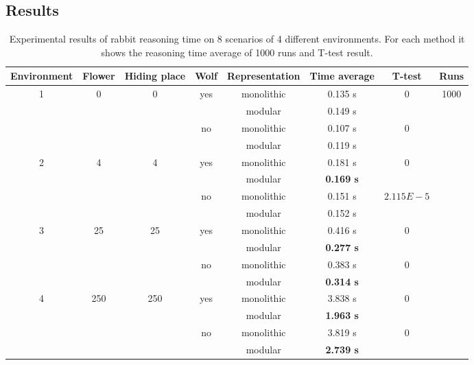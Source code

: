\documentclass{aamas2012}
\begin{document}
\subsection{Results}


	\begin{table}
		\label{experiment_results}
		\centering
		\begin{tabular}{ | c | c | c | c | c | c | c | c | }
		\hline
		Environment & Flower & Hiding place & Wolf & Representation & Time average & T-test & Runs\\	
		\hline
	 	\multirow{4}{*}{1} & \multirow{4}{*}{0} & \multirow{4}{*}{0} & \multirow{2}{*}{yes} & monolithic & 0.135 s & \multirow{2}{*}{0} & \multirow{16}{*}{1000} \\
		& & & & modular & 0.149 s & & \\ \cline{4-7}
		& & & \multirow{2}{*}{no} & monolithic & 0.107 s & \multirow{2}{*}{0} & \\
		& & & & modular & 0.119 s & & \\ \cline{1-7}
		\multirow{4}{*}{2} & \multirow{4}{*}{4} & \multirow{4}{*}{4} & \multirow{2}{*}{yes} & monolithic & 0.181 s & \multirow{2}{*}{0} & \\
		& & & & modular & \textbf{0.169 s} & & \\ \cline{4-7}
		& & & \multirow{2}{*}{no} & monolithic & 0.151 s & \multirow{2}{*}{$2.115E-5$} & \\
		& & & & modular & 0.152 s & & \\ \cline{1-7}
		\multirow{4}{*}{3} & \multirow{4}{*}{25} & \multirow{4}{*}{25} & \multirow{2}{*}{yes} & monolithic & 0.416 s & \multirow{2}{*}{0} & \\
		& & & & modular & \textbf{0.277 s} & & \\ \cline{4-7}
		& & & \multirow{2}{*}{no} & monolithic & 0.383 s & \multirow{2}{*}{0} & \\
		& & & & modular & \textbf{0.314 s} & & \\ \cline{1-7}
		\multirow{4}{*}{4} & \multirow{4}{*}{250} & \multirow{4}{*}{250} & \multirow{2}{*}{yes} & monolithic & 3.838 s & \multirow{2}{*}{0} & \\
		& & & & modular & \textbf{1.963 s} & & \\ \cline{4-7}
		& & &  \multirow{2}{*}{no} & monolithic & 3.819 s & \multirow{2}{*}{0} & \\
		& & & & modular & \textbf{2.739 s} & & \\ \cline{1-7}
		\hline
		\end{tabular}
		\caption
		{
			Experimental results of rabbit reasoning time on 8 scenarios of 4 different environments.
			For each method it shows the reasoning time average of 1000 runs and T-test result.
		}
	\end{table}
\end{document}

